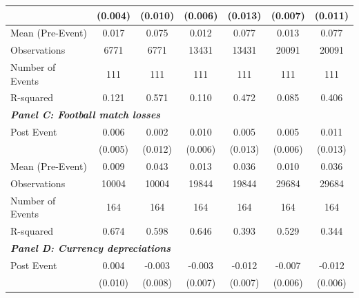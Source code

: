 {\begin{tabular}{l*{6}{c}}
&     (0.004)         &     (0.010)         &     (0.006)         &     (0.013)         &     (0.007)         &     (0.011)         \\
\midrule
Mean (Pre-Event)&       0.017         &       0.075         &       0.012         &       0.077         &       0.013         &       0.077         \\
Observations&        6771         &        6771         &       13431         &       13431         &       20091         &       20091         \\
Number of Events&         111         &         111         &         111         &         111         &         111         &         111         \\
R-squared   &       0.121         &       0.571         &       0.110         &       0.472         &       0.085         &       0.406         \\
\bottomrule
\multicolumn{7}{l}{\textbf{\textit{Panel C: Football match losses}}} \\
Post Event  &       0.006         &       0.002         &       0.010         &       0.005         &       0.005         &       0.011         \\
&     (0.005)         &     (0.012)         &     (0.006)         &     (0.013)         &     (0.006)         &     (0.013)         \\
\midrule
Mean (Pre-Event)&       0.009         &       0.043         &       0.013         &       0.036         &       0.010         &       0.036         \\
Observations&       10004         &       10004         &       19844         &       19844         &       29684         &       29684         \\
Number of Events&         164         &         164         &         164         &         164         &         164         &         164         \\
R-squared   &       0.674         &       0.598         &       0.646         &       0.393         &       0.529         &       0.344         \\
\bottomrule
\multicolumn{7}{l}{\textbf{\textit{Panel D: Currency depreciations}}} \\
Post Event  &       0.004         &      -0.003         &      -0.003         &      -0.012\sym{*}  &      -0.007         &      -0.012\sym{*}  \\
&     (0.010)         &     (0.008)         &     (0.007)         &     (0.007)         &     (0.006)         &     (0.006)         \\

\end{tabular}}
